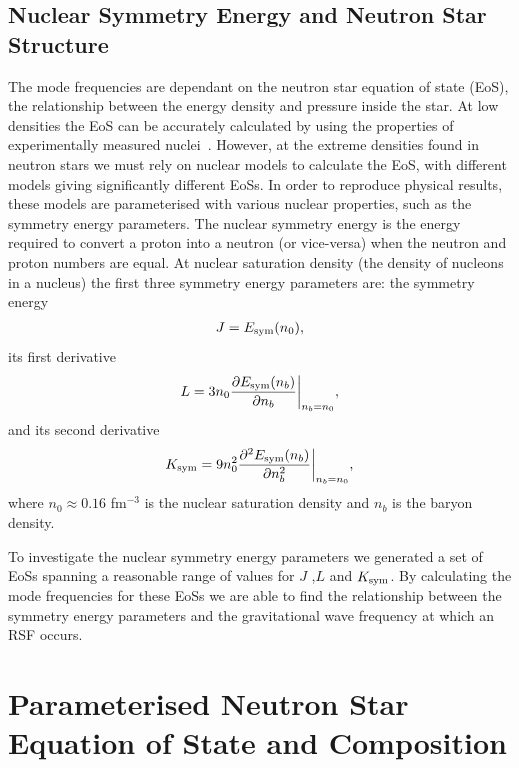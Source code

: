 \documentclass[fleqn,usenatbib]{mnras}
\begin{document}
\subsection{Nuclear Symmetry Energy and Neutron Star Structure}
\hspace{\parindent}The mode frequencies are dependant on the neutron star equation of state (EoS), the relationship between the energy density and pressure inside the star. At low densities the EoS can be accurately calculated by using the properties of experimentally measured nuclei~\cite{baym1971ground}. However, at the extreme densities found in neutron stars we must rely on nuclear models to calculate the EoS, with different models giving significantly different EoSs. In order to reproduce physical results, these models are parameterised with various nuclear properties, such as the symmetry energy parameters. The nuclear symmetry energy is the energy required to convert a proton into a neutron (or vice-versa) when the neutron and proton numbers are equal. At nuclear saturation density (the density of nucleons in a nucleus) the first three symmetry energy parameters are: the symmetry energy
\begin{align}
J=E_{\rm sym}(n_0),    
\label{eq:sym_J}
\end{align}
\noindent its first derivative 
\begin{align}
L=3n_0\frac{\partial E_{\rm sym}(n_b)}{\partial n_b}\biggr\rvert_{n_b=n_0},  
\label{eq:sym_L}
\end{align}
\noindent and its second derivative
\begin{align}
K_{\rm sym}=9n_0^2\frac{\partial^2 E_{\rm sym}(n_b)}{\partial n_b^2}\biggr\rvert_{n_b=n_0},
\label{eq:sym_K}
\end{align}
\noindent where $n_0\approx 0.16$ fm$^{-3}$ is the nuclear saturation density and $n_b$ is the baryon density.

\hspace{\parindent}To investigate the nuclear symmetry energy parameters we generated a set of EoSs spanning a reasonable range of values for $J$ ,$L$ and $K_{\rm sym}$. By calculating the mode frequencies for these EoSs we are able to find the relationship between the symmetry energy parameters and the gravitational wave frequency at which an RSF occurs.







\section{Parameterised Neutron Star Equation of State and Composition}
\end{document}
